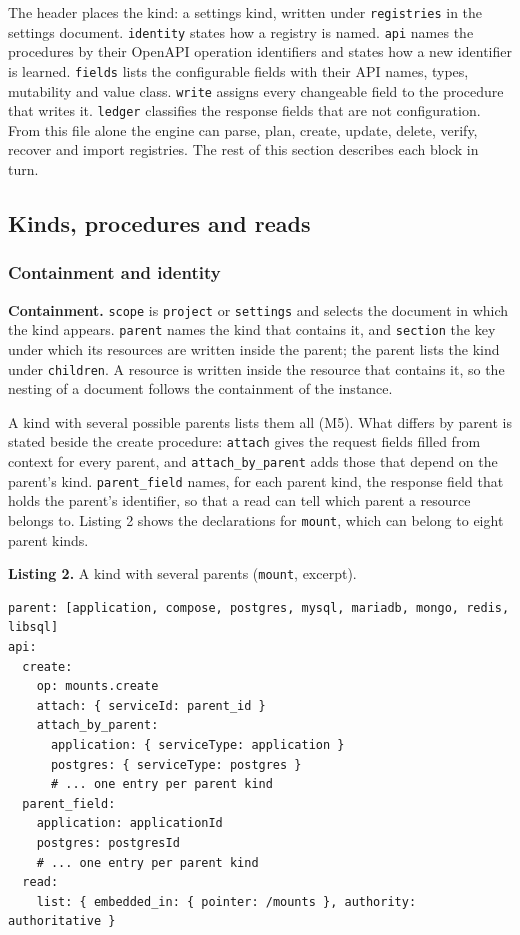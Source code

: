 The header places the kind: a settings kind, written under \texttt{registries} in the settings document.
\texttt{identity} states how a registry is named. \texttt{api} names the procedures by their OpenAPI operation
identifiers and states how a new identifier is learned. \texttt{fields} lists the configurable fields with
their API names, types, mutability and value class. \texttt{write} assigns every changeable field to the
procedure that writes it. \texttt{ledger} classifies the response fields that are not configuration. From
this file alone the engine can parse, plan, create, update, delete, verify, recover and import
registries. The rest of this section describes each block in turn.

\subsection{Kinds, procedures and reads}\label{sec:5.2}

\subsubsection*{Containment and identity}

\textbf{Containment.} \texttt{scope} is \texttt{project} or \texttt{settings} and selects the document in which the kind
appears. \texttt{parent} names the kind that contains it, and \texttt{section} the key under which its resources are
written inside the parent; the parent lists the kind under \texttt{children}. A resource is written inside
the resource that contains it, so the nesting of a document follows the containment of the instance.

A kind with several possible parents lists them all (M5). What differs by parent is stated beside the
create procedure: \texttt{attach} gives the request fields filled from context for every parent, and
\texttt{attach\_by\_parent} adds those that depend on the parent's kind. \texttt{parent\_field} names, for each parent
kind, the response field that holds the parent's identifier, so that a read can tell which parent a
resource belongs to. Listing 2 shows the declarations for \texttt{mount}, which can belong to eight parent
kinds.

\textbf{Listing 2.} A kind with several parents (\texttt{mount}, excerpt).

\begin{lstlisting}
parent: [application, compose, postgres, mysql, mariadb, mongo, redis, libsql]
api:
  create:
    op: mounts.create
    attach: { serviceId: parent_id }
    attach_by_parent:
      application: { serviceType: application }
      postgres: { serviceType: postgres }
      # ... one entry per parent kind
  parent_field:
    application: applicationId
    postgres: postgresId
    # ... one entry per parent kind
  read:
    list: { embedded_in: { pointer: /mounts }, authority: authoritative }
\end{lstlisting}

